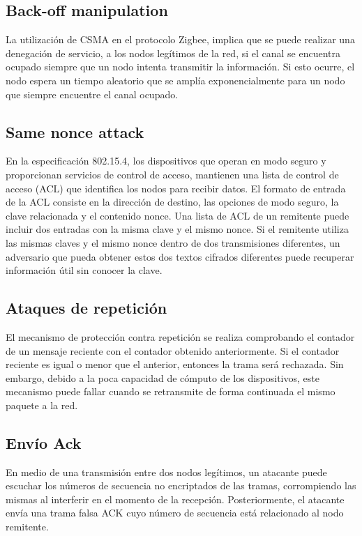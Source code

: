 \subsection{Back-oﬀ manipulation}
La utilización de CSMA en el protocolo Zigbee, implica que se puede realizar una denegación de servicio, a los nodos legítimos de la red, si el canal se encuentra ocupado siempre que un nodo intenta transmitir la información. Si esto ocurre, el nodo espera un tiempo aleatorio que se amplía exponencialmente para un nodo que siempre encuentre el canal ocupado.
\subsection{Same nonce attack}
En la especificación 802.15.4, los dispositivos que operan en modo seguro y proporcionan servicios de control de acceso, mantienen una lista de control de acceso (ACL) que identifica los nodos para recibir datos. El formato de entrada de la ACL consiste en la dirección de destino, las opciones de modo seguro, la clave relacionada y el contenido nonce. Una lista de ACL de un remitente puede incluir dos entradas con la misma clave y el mismo nonce. Si el remitente utiliza las mismas claves y el mismo nonce dentro de dos transmisiones diferentes, un adversario que pueda obtener estos dos textos cifrados diferentes puede recuperar información útil sin conocer la clave.
\subsection{Ataques de repetición}
El mecanismo de protección contra repetición se realiza comprobando el contador de un mensaje reciente con el contador obtenido anteriormente. Si el contador reciente es igual o menor que el anterior, entonces la trama será rechazada. Sin embargo, debido a la poca capacidad de cómputo de los dispositivos, este mecanismo puede fallar cuando se retransmite de forma continuada el mismo paquete a la red.

\subsection{Envío Ack}
En medio de una transmisión entre dos nodos legítimos, un atacante puede escuchar los números de secuencia no encriptados de las tramas, corrompiendo las mismas al interferir en el momento de la recepción. Posteriormente, el atacante envía una trama falsa ACK cuyo número de secuencia está relacionado al nodo remitente.
